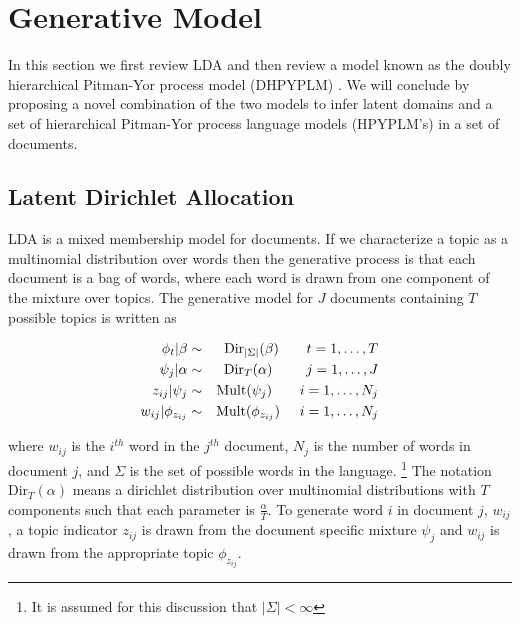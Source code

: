 \section{Generative Model}

In this section we first review LDA and then review a model known as the doubly hierarchical Pitman-Yor process model (DHPYPLM) \cite{Wood2009a}. We will conclude by proposing a novel combination of the two models to infer latent domains and a set of hierarchical Pitman-Yor process language models (HPYPLM's) \cite{Teh2006a} in a set of documents.

\subsection{Latent Dirichlet Allocation}

LDA \cite{Blei2003} is a mixed membership model for documents.  If we characterize a topic as a multinomial distribution over words then the generative process is that each document is a bag of words, where each word is drawn from one component of the mixture over topics. The generative model for $J$ documents containing $T$ possible topics is written as 

\begin{eqnarray}
\phi_t | \beta  &\sim& \textrm{Dir}_{|\Sigma|}(\beta)  \hspace{.7cm} t = 1,\ldots,T \nonumber \\
\psi_j | \alpha &\sim& \textrm{Dir}_T(\alpha) \hspace{.85cm} j = 1,\ldots, J\nonumber \\
z_{ij} | \psi_j &\sim& \textrm{Mult}(\psi_j) \hspace{.7cm} i = 1,\ldots, N_j \nonumber \\
w_{ij} | \phi_{z_{ij}} &\sim& \textrm{Mult}(\phi_{z_{ij}}) \hspace{.5cm} i = 1,\ldots, N_j 
\end{eqnarray}

\noindent where $w_{ij}$ is the $i^{th}$ word in the $j^{th}$ document, $N_j$ is the number of words in document $j$, and $\Sigma$ is the set of possible words in the language. \footnote{It is assumed for this discussion that $| \Sigma| < \infty$} The notation $\textrm{Dir}_T(\alpha)$ means a dirichlet distribution over multinomial distributions with $T$ components such that each parameter is $\frac{\alpha}{T}$.  To generate word $i$ in document $j$, $w_{ij}$, a topic indicator $z_{ij}$ is drawn from the document specific mixture $\psi_j$ and $w_{ij}$ is drawn from the appropriate topic $\phi_{z_{ij}}$. 

